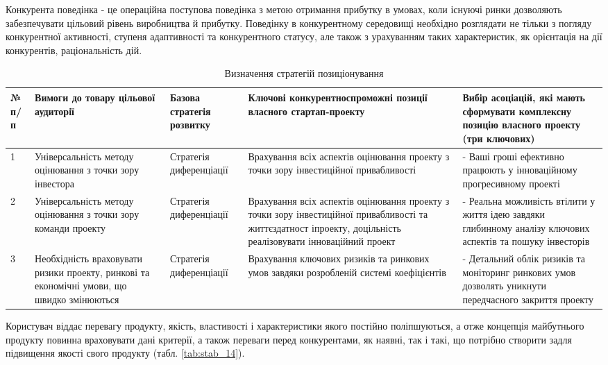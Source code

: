Конкурента поведінка - це операційна поступова поведінка з метою отримання прибутку в умовах, коли існуючі ринки дозволяють забезпечувати цільовий рівень виробництва й прибутку. Поведінку в конкурентному середовищі необхідно розглядати не тільки з погляду конкурентної активності, ступеня адаптивності та конкурентного статусу, але також з урахуванням таких характеристик, як орієнтація на дії конкурентів, раціональність дій.
\begin{table}[H]
\fontsize{12pt}{12pt}\selectfont
	\begin{tabularx}{\textwidth}{|l|X|X|X|X|}
    \hline
    № п/п & Вимоги до товару цільової аудиторії & Базова стратегія розвитку & Ключові конкурентноспроможні позиції власного стартап-проекту & Вибір асоціацій, які мають сформувати комплексну позицію власного проекту (три ключових) \\ \hline
    1 & Універсальність методу оцінювання з точки зору інвестора & Стратегія диференціації & Врахування всіх аспектів оцінювання проекту з точки зору інвестиційної привабливості & - Ваші гроші ефективно працюють у інноваційному прогресивному проекті \\ \hline
    2 & Універсальність методу оцінювання з точки зору команди проекту & Стратегія диференціації & Врахування всіх аспектів оцінювання проекту з точки зору інвестиційної привабливості та життєздатност іпроекту, доцільність реалізовувати інноваційний проект & - Реальна можливість втілити у життя ідею завдяки глибинному аналізу ключових аспектів та пошуку інвесторів \\ \hline
    3 & Необхідність враховувати ризики проекту, ринкові та економічні умови, що швидко змінюються & Стратегія диференціації & Врахування ключових ризиків та ринкових умов завдяки розробленій системі коефіцієнтів & - Детальний облік ризиків та моніторинг ринкових умов дозволять уникнути передчасного закриття проекту \\
    \hline
    \end{tabularx}
\caption{Визначення стратегій позиціонування} \label{tab:stab_13}
\end{table}

Користувач віддає перевагу продукту, якість, властивості і характеристики якого постійно поліпшуються, а отже концепція майбутнього продукту повинна враховувати дані критерії, а також переваги перед конкурентами, як наявні, так і такі, що потрібно створити задля підвищення якості свого продукту (табл. \ref{tab:stab_14}).

